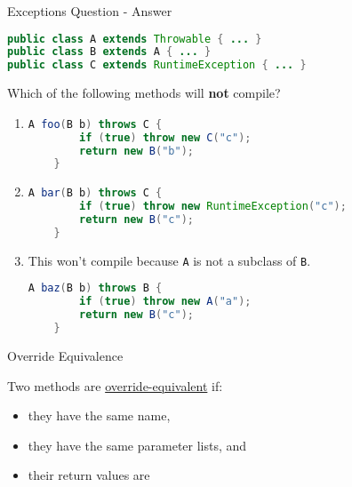 \documentclass{beamer}
\begin{document}
\begin{frame}[fragile]{Exceptions Question - Answer}

\vspace{-.05in}
\begin{lstlisting}[language=Java]
public class A extends Throwable { ... }
public class B extends A { ... }
public class C extends RuntimeException { ... }
\end{lstlisting}
\vspace{-.05in}
Which of the following methods will {\bf not} compile?
\vspace{-.05in}
\begin{enumerate} \itemsep0pt
\item
\begin{lstlisting}[language=Java]
    A foo(B b) throws C {
        if (true) throw new C("c");
        return new B("b");
    }
\end{lstlisting}

\item
\begin{lstlisting}[language=Java]
    A bar(B b) throws C {
        if (true) throw new RuntimeException("c");
        return new B("c");
    }
\end{lstlisting}

\item This won't compile because {\tt A} is not a subclass of {\tt B}.
\begin{lstlisting}[language=Java]
    A baz(B b) throws B {
        if (true) throw new A("a");
        return new B("c");
    }
\end{lstlisting}


\end{enumerate}



\end{frame}


\begin{frame}[fragile]{Override Equivalence}

Two methods are \href{http://docs.oracle.com/javase/specs/jls/se8/html/jls-8.html#jls-8.4.2}{override-equivalent} if:
\begin{itemize}
\item they have the same name,
\item they have the same parameter lists, and
\item their return values are 
\end{itemize}

\end{frame}
\end{document}
